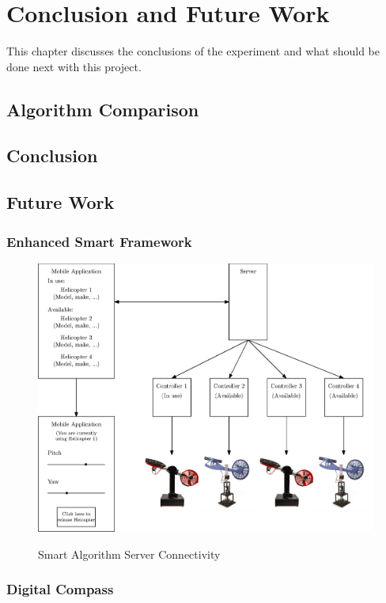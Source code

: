 \chapter{Conclusion and Future Work}
\label{ch: Chapter6}
This chapter discusses the conclusions of the experiment and what should be done next with this project.
\section{Algorithm Comparison}

\section{Conclusion}

\section{Future Work}
\subsection{Enhanced Smart Framework}
\begin{figure}[!htbp]
    \centering
    \includegraphics[width=.46\textwidth,keepaspectratio=true]{figs/ipe/smartAlg.eps}
    \label{fig:Smart_Alg}
    \caption{Smart Algorithm Server Connectivity}
\end{figure}

\subsection{Digital Compass}

